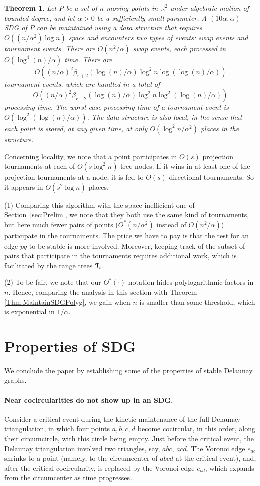 \documentclass[letter,11pt]{article}
\newtheorem{theorem}{Theorem}[section]
\def \reals{{\mathbb R}}
\def\T{\EuScript{T}}
\begin{document}
\begin{theorem}\label{Thm:ReducedS}
Let $P$ be a set of $n$ moving points in $\reals^2$ under algebraic
motion of bounded degree, 
and let $\alpha > 0$ be a sufficiently small parameter. A $(10\alpha,\alpha)$-SDG of $P$
can be maintained using a data structure that requires 
$O((n/\alpha^2) \log n)$ space and encounters two types of
events: swap events 
and tournament events.  There are $O(n^2/\alpha)$ swap events, 
each processed in $O(\log^4(n)/\alpha)$ time.
There are
$$O((n/\alpha)^2 \beta_{r+2}(\log (n)/\alpha)\log^2n\log(\log (n)/\alpha))$$
 tournament 
events, which are handled in a total of 
$$O((n/\alpha)^2 \beta_{r+2}(\log (n)/\alpha)\log^2n\log^2(\log (n)/\alpha))$$
processing time. The worst-case processing time of a
tournament event is $O(\log^2(\log (n)/\alpha))$. The data structure is also {\it local}, in the sense that each point
is stored, at any given time, at only $O(\log^2n/\alpha^2)$ places in the structure.
\end{theorem}
Concerning locality, we note that a point participates in $O(s)$ projection tournaments at each of $O(s\log^2n)$ tree nodes. If it wins in at least one of the projection tournaments at a node, it is fed to $O(s)$ 
directional tournaments. So it appears in $O(s^2\log n)$ places.

 (1) Comparing this algorithm with the space-inefficient one of Section~\ref{sec:Prelim}, we note that they both use the 
same kind of tournaments, but here much fewer pairs of points 
($O^*(n/\alpha^2)$ instead of $O(n^2/\alpha)$) participate in the 
tournaments. The price we have to pay is that the test for an edge $pq$
to be stable is more involved. Moreover, keeping track of the subset of 
pairs that participate in the tournaments requires additional work,
which is facilitated by the range trees $\T_i$.

\medskip\noindent
(2) To be fair, we note that our $O^*(\cdot)$ notation hides polylogarithmic factors in $n$. Hence, comparing the analysis in this section with Theorem \ref{Thm:MaintainSDGPolyg}, we gain when $n$ is smaller than some threshold, which is exponential in $1/\alpha$.
\section{Properties of  SDG}\label{Sec:SDGProperties}
We conclude the paper by establishing some of the properties of stable Delaunay graphs. 

\paragraph{Near cocircularities do not show up in an SDG.}
Consider a critical event during the kinetic maintenance of the full
Delaunay triangulation, in which four points $a,b,c,d$ become cocircular,
in this order, along their circumcircle, with this circle being empty.
Just before the critical event, the Delaunay triangulation involved
two triangles, say, $abc$, $acd$. The Voronoi edge $e_{ac}$ shrinks
to a point (namely, to the circumcenter of $abcd$ at the critical event),
and, after the critical cocircularity, is replaced by the Voronoi edge
$e_{bd}$, which expands from the circumcenter as time progresses.
\end{document}
